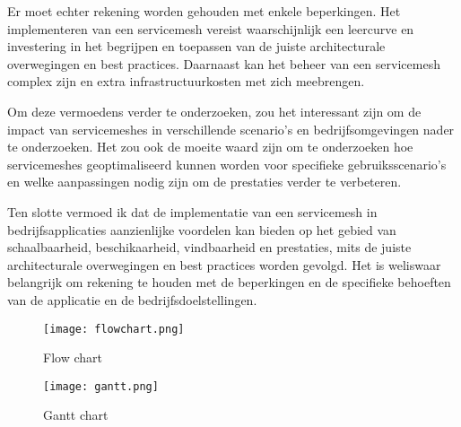 \documentclass{hogent-article}
\begin{document}
Er moet echter rekening worden gehouden met enkele beperkingen. Het implementeren van een servicemesh vereist waarschijnlijk een leercurve en investering in het begrijpen en toepassen van de juiste architecturale overwegingen en best practices. Daarnaast kan het beheer van een servicemesh complex zijn en extra infrastructuurkosten met zich meebrengen.

Om deze vermoedens verder te onderzoeken, zou het interessant zijn om de impact van servicemeshes in verschillende scenario's en bedrijfsomgevingen nader te onderzoeken. Het zou ook de moeite waard zijn om te onderzoeken hoe servicemeshes geoptimaliseerd kunnen worden voor specifieke gebruiksscenario's en welke aanpassingen nodig zijn om de prestaties verder te verbeteren.

Ten slotte vermoed ik dat de implementatie van een servicemesh in bedrijfsapplicaties aanzienlijke voordelen kan bieden op het gebied van schaalbaarheid, beschikaarheid, vindbaarheid en prestaties, mits de juiste architecturale overwegingen en best practices worden gevolgd. Het is weliswaar belangrijk om rekening te houden met de beperkingen en de specifieke behoeften van de applicatie en de bedrijfsdoelstellingen.

\begin{figure*}[t]   
	\centering   
	\texttt{[image: flowchart.png]}  
	\caption{Flow chart}
	\label{fig:flowchart}				 
\end{figure*} 
\begin{figure*}[t]   
	\centering   
	\texttt{[image: gantt.png]}   
	\caption{Gantt chart}	
	\label{fig:gantt}	
\end{figure*} 

\nocite{*}
\printbibliography
\end{document}
